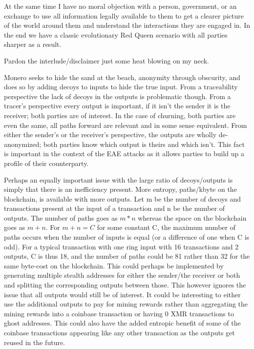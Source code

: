 At the same time I have no moral objection with a person, government, or an exchange to use all information legally available to them to get a clearer picture of the world around them and understand the interactions they are engaged in.
In the end we have a classic evolutionary Red Queen scenario with all parties sharper as a result.

Pardon the interlude/disclaimer just some heat blowing on my neck.

Monero seeks to hide the sand at the beach, anonymity through obscurity, and does so by adding decoys to inputs to hide the true input.  
From a traceability perspective the lack of decoys in the outputs is problematic though.  
From a tracer's perspective every output is important, if it isn't the sender it is the receiver; both parties are of interest.  
In the case of churning, both parties are even the same, all paths forward are relevant and in some sense equivalent.   
From either the sender's or the receiver's perspective, the outputs are wholly de-anonymized; both parties know which output is theirs and which isn't.
This fact is important in the context of the EAE attacks as it allows parties to build up a profile of their counterparty.

Perhaps an equally important issue with the large ratio of decoys/outputs is simply that there is an inefficiency present.  
More entropy, paths/kbyte on the blockchain, is available with more outputs.
Let m be the number of decoys and transactions present at the input of a transaction and n be the number of outputs.  
The number of paths goes as $m*n$ whereas the space on the blockchain goes as $m+n$.  
For $m+n = C$ for some constant C, the maximum number of paths occurs when the number of inputs is equal (or a difference of one when C is odd).
For a typical transaction with one ring input with 16 transactions and 2 outputs, C is thus 18, and the number of paths could be 81 rather than 32 for the same byte-cost on the blockchain.
This could perhaps be implemented by generating multiple stealth addresses for either the sender/the receiver or both and splitting the corresponding outputs between those.  
This however ignores the issue that all outputs would still be of interest.  
It could be interesting to either use the additional outputs to pay for mining rewards rather than aggregating the mining rewards into a coinbase transaction or having 0 XMR transactions to ghost addresses.
This could also have the added entropic benefit of some of the coinbase transactions appearing like any other transaction as the outputs get reused in the future.

